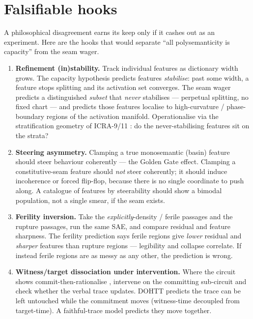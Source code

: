 \documentclass[11pt,a4paper]{article}
\begin{document}
\section{Falsifiable hooks}\label{sec:hooks}

A philosophical disagreement earns its keep only if it cashes out as an experiment. Here are the
hooks that would separate ``all polysemanticity is capacity'' from the seam wager.

\begin{enumerate}
  \item \textbf{Refinement (in)stability.} Track individual features as dictionary width grows.
  The capacity hypothesis predicts features \emph{stabilise}: past some width, a feature stops
  splitting and its activation set converges. The seam wager predicts a distinguished
  \emph{subset} that \emph{never} stabilises --- perpetual splitting, no fixed chart --- and
  predicts those features localise to high-curvature / phase-boundary regions of the activation
  manifold. Operationalise via the stratification geometry of ICRA-9/11 \cite{icra9,icra11}:
  do the never-stabilising features sit on the strata?

  \item \textbf{Steering asymmetry.} Clamping a true monosemantic (basin) feature should steer
  behaviour coherently --- the Golden Gate effect. Clamping a constitutive-seam feature should
  \emph{not} steer coherently; it should induce incoherence or forced flip-flop, because there is
  no single coordinate to push along. A catalogue of features by steerability should show a
  bimodal population, not a single smear, if the seam exists.

  \item \textbf{Ferility inversion.} Take the \emph{explicitly}-density / ferile passages
  \cite{explicitly} and the rupture passages, run the same SAE, and compare residual and feature
  sharpness. The ferility prediction says ferile regions give \emph{lower} residual and
  \emph{sharper} features than rupture regions --- legibility and collapse correlate. If instead
  ferile regions are as messy as any other, the prediction is wrong.

  \item \textbf{Witness/target dissociation under intervention.} Where the circuit shows
  commit-then-rationalise \cite{biology}, intervene on the committing sub-circuit and check
  whether the verbal trace updates. DOHTT predicts the trace can be left untouched while the
  commitment moves (witness-time decoupled from target-time). A faithful-trace model predicts they
  move together.
\end{enumerate}
\end{document}
